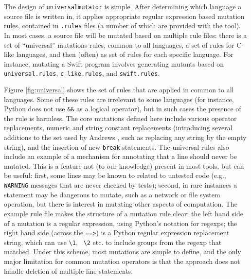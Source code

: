 The design of {\tt universalmutator} is simple.  After determining
which language a source file is written in, it applies appropriate
regular expression based mutation rules, contained in {\tt .rules}
files (a number of which are provided with the tool).  In most cases, a source file will be mutated based on multiple
rule files:  there is a set of ``universal'' mutations rules, common
to all languages, a set of rules for C-like languages, and then
(often) as set of rules for each specific language.  For instance,
mutating a Swift program involves generating mutants based on {\tt
  universal.rules}, {\tt c\_like.rules}, and {\tt swift.rules}.  

Figure \ref{fig:universal} shows the set of rules that are applied in
common to all languages.  Some of these rules are irrelevant to some
languages (for instance, Python does not use {\tt \&\&} as a logical
operator), but in such cases the presence of the rule is harmless.  The
core mutations defined here include various operator replacements,
numeric and string constant replacements (introducing several
additions to the set used by Andrews \cite{mutant}, such as replacing
any string by the empty string), and the insertion of new {\tt break}
statements.  The universal rules also include an example of a
mechanism for annotating that a line should never be mutated.  This is
a feature not (to our knowledge) present in most tools, but can be
useful:  first, some lines may be known to related to untested code
(e.g., {\tt WARNING} messages that are never checked by tests);
second, in rare instances a statement may be dangerous to mutate, such
as a network or file system operation, but there is interest in
mutating other aspects of computation.  The example rule file makes
the structure of a mutation rule clear:  the left hand side of a
mutation is a regular expression, using Python's notation for regexps;
the right hand side (across the {\tt ==>}) is a Python regular
expression replacement string, which can use {\tt \textbackslash 1}, {\tt
  \textbackslash 2}
etc. to include groups from the regexp that matched.  Under this
scheme, most mutations are simple to define, and the only major
limitation for common mutation operators is that the approach does not
handle deletion of multiple-line statements.

